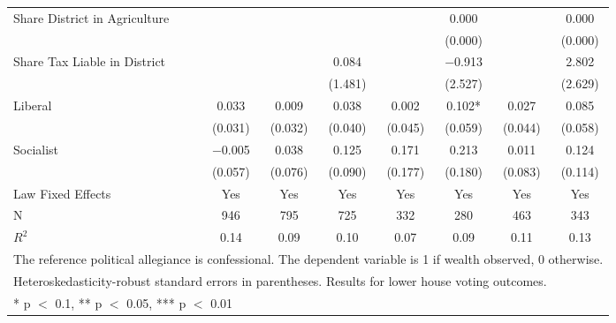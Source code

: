 \begin{table}
\begin{tabular}[t]{lccccccc}
Share District in Agriculture &  &  &  &  & \num{0.000} &  & \num{0.000}\\
 &  &  &  &  & (\num{0.000}) &  & (\num{0.000})\\
Share Tax Liable in District &  &  & \num{0.084} &  & \num{-0.913} &  & \num{2.802}\\
 &  &  & (\num{1.481}) &  & (\num{2.527}) &  & (\num{2.629})\\
Liberal & \num{0.033} & \num{0.009} & \num{0.038} & \num{0.002} & \num{0.102}* & \num{0.027} & \num{0.085}\\
 & (\num{0.031}) & (\num{0.032}) & (\num{0.040}) & (\num{0.045}) & (\num{0.059}) & (\num{0.044}) & (\num{0.058})\\
Socialist & \num{-0.005} & \num{0.038} & \num{0.125} & \num{0.171} & \num{0.213} & \num{0.011} & \num{0.124}\\
 & (\num{0.057}) & (\num{0.076}) & (\num{0.090}) & (\num{0.177}) & (\num{0.180}) & (\num{0.083}) & (\num{0.114})\\
\midrule
Law Fixed Effects & Yes & Yes & Yes & Yes & Yes & Yes & Yes\\
N & \num{946} & \num{795} & \num{725} & \num{332} & \num{280} & \num{463} & \num{343}\\
$R^2$ & \num{0.14} & \num{0.09} & \num{0.10} & \num{0.07} & \num{0.09} & \num{0.11} & \num{0.13}\\
\bottomrule
\multicolumn{8}{l}{\rule{0pt}{1em}The reference political allegiance is confessional. The dependent variable is 1 if wealth observed, 0 otherwise.}\\
\multicolumn{8}{l}{\rule{0pt}{1em}Heteroskedasticity-robust standard errors in parentheses. Results for lower house voting outcomes.}\\
\multicolumn{8}{l}{\rule{0pt}{1em}* p $<$ 0.1, ** p $<$ 0.05, *** p $<$ 0.01}\\
\end{tabular}
\end{table}
